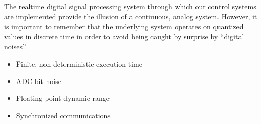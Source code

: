 

The realtime digital signal processing system through which our
control systems are implemented provide the illusion of a continuous,
analog system.  However, it is important to remember that the
underlying system operates on quantized values in discrete time in
order to avoid being caught by surprise by ``digital noises''.

\begin{itemize}
\item Finite, non-deterministic execution time
\item ADC bit noise
\item Floating point dynamic range
\item Synchronized communications
\end{itemize}
